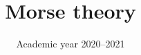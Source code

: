 \documentclass[working]{tuftebook}
\title{Morse theory}
\date{Academic year 2020--2021}
\begin{document}
    \renewcommand{\thepage}{\roman{page}}
    
    \cleardoublepage
    \maketitle
    
    \listofsymbols
    \tableofcontents
    \cleardoublepage
    \pagestyle{fancy}
    \renewcommand{\thepage}{\arabic{page}}
    \setcounter{page}{1}
    
    
    
    
    
    

    \printbibliography
\end{document}
